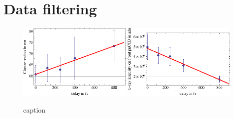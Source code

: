 \section{Data filtering}\label{sec:hitfinding}
\begin{figure}
	\centering
		\includegraphics[width=0.49\textwidth]{images/filter-size.eps}
		\includegraphics[width=0.49\textwidth]{images/filter-sum-frontpnCCD.eps}
	\caption{caption}
	\label{fig:filter-size-intensity}
\end{figure}
